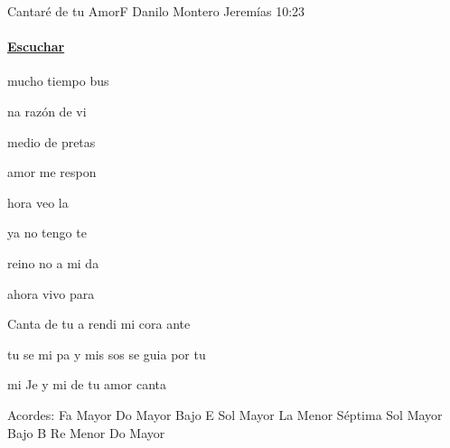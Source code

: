 \documentclass[12pt, spanish]{book}
\newcommand{\NotCCLIed}{\relax}
\begin{document}
    \begin{song}{Cantaré de tu Amor}{F}
    {} %
    {Danilo Montero}
    {Jeremías 10:23} %
    {} %
        \ifChordBk
        \paragraph{\mbox{}\hfill\protect\href{https://open.spotify.com/intl-es/track/7kzqc0u8SNQAU5Wca0WNKo}{Escuchar}\mbox{}\hfill}
        \fi


        \begin{SBOpGroup}
             mucho tiempo bus

            na razón de vi

             medio de  pretas

             amor me respon
        \end{SBOpGroup}


        \begin{SBOpGroup}
            hora veo la 

             ya no tengo te

             reino no a mi da

             ahora vivo para 
        \end{SBOpGroup}

        \begin{SBChorus}
            Canta de tu a rendi mi cora ante 

            tu se mi pa y mis sos se guia por tu 

            mi Je y mi  de tu  amor canta
        \end{SBChorus}

        \ifChordBk
        \begin{SBOpGroup}
            Acordes:
            \upchord{\F}\qquad Fa Mayor \hfill
            \upchord{\CE}\qquad Do Mayor Bajo E  \hfill\null\break
            \upchord{\G}\qquad Sol Mayor \hfill
            \upchord{\Amseven}\qquad La Menor S\'eptima \hfill\null\break
            \upchord{\GB}\qquad Sol Mayor Bajo B \hfill\qquad\qquad\qquad
            \upchord{\Dm}\qquad Re Menor \hfill\null\break
            \upchord{\C}\qquad Do Mayor \hfill
        \end{SBOpGroup}

        \fi
    \end{song}
\end{document}
